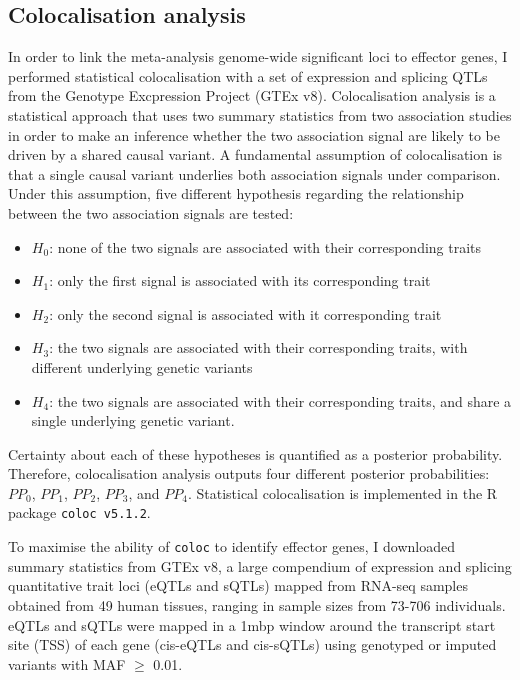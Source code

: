 \subsection{Colocalisation analysis}
In order to link the meta-analysis genome-wide significant loci to effector genes, I performed statistical colocalisation with a set of expression and splicing QTLs from the Genotype Excpression Project (GTEx v8). Colocalisation analysis is a statistical approach that uses two summary statistics from two association studies in order to make an inference whether the two association signal are likely to be driven by a shared causal variant. A fundamental assumption of colocalisation is that a single causal variant underlies both association signals under comparison. Under this assumption, five different hypothesis regarding the relationship between the two association signals are tested:
\begin{itemize}
  \item $H_{0}$: none of the two signals are associated with their corresponding traits
  \item $H_{1}$: only the first signal is associated with its corresponding trait
  \item $H_{2}$: only the second signal is associated with it corresponding trait
  \item $H_{3}$: the two signals are associated with their corresponding traits, with different underlying genetic variants
  \item $H_{4}$: the two signals are associated with their corresponding traits, and share a single underlying genetic variant.
\end{itemize}
Certainty about each of these hypotheses is quantified as a posterior probability. Therefore, colocalisation analysis outputs four different posterior probabilities: $PP_{0}$, $PP_{1}$, $PP_{2}$, $PP_{3}$, and $PP_{4}$. Statistical colocalisation is implemented in the R package \Verb+coloc v5.1.2+.

To maximise the ability of \Verb+coloc+ to identify effector genes, I downloaded summary statistics from GTEx v8, a large compendium of expression and splicing quantitative trait loci (eQTLs and sQTLs) mapped from RNA-seq samples obtained from 49 human tissues, ranging in sample sizes from 73-706 individuals. eQTLs and sQTLs were mapped in a 1mbp window around the transcript start site (TSS) of each gene (cis-eQTLs and cis-sQTLs) using genotyped or imputed variants with MAF $\geq$ 0.01.

